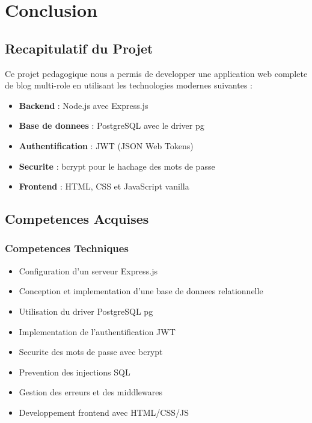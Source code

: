 \documentclass[a4paper,12pt]{book}
\begin{document}
\chapter{Conclusion}

\section{Recapitulatif du Projet}

Ce projet pedagogique nous a permis de developper une application web complete de blog multi-role en utilisant les technologies modernes suivantes :

\begin{itemize}
    \item \textbf{Backend} : Node.js avec Express.js
    \item \textbf{Base de donnees} : PostgreSQL avec le driver pg
    \item \textbf{Authentification} : JWT (JSON Web Tokens)
    \item \textbf{Securite} : bcrypt pour le hachage des mots de passe
    \item \textbf{Frontend} : HTML, CSS et JavaScript vanilla
\end{itemize}

\section{Competences Acquises}

\subsection{Competences Techniques}

\begin{itemize}
    \item Configuration d'un serveur Express.js
    \item Conception et implementation d'une base de donnees relationnelle
    \item Utilisation du driver PostgreSQL pg
    \item Implementation de l'authentification JWT
    \item Securite des mots de passe avec bcrypt
    \item Prevention des injections SQL
    \item Gestion des erreurs et des middlewares
    \item Developpement frontend avec HTML/CSS/JS
\end{itemize}
\end{document}
